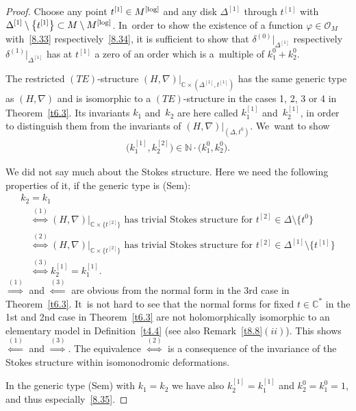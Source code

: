 \documentclass[pdftex]{sigma}%
\numberwithin{equation}{section}
\numberwithin{figure}{section}
\newcommand{\N}{{\mathbb N}}
\newcommand{\C}{{\mathbb C}}
\newcommand{\OO}{{\mathcal O}}
\newcommand{\nnn}{\nabla}
\begin{document}
\begin{proof}
Choose any point $t^{[1]}\in M^{\rm [log]}$ and any disk
$\Delta^{[1]}$ through $t^{[1]}$ with
$\Delta^{[1]}\setminus \big\{t^{[1]}\big\}\subset M\setminus M^{\rm [log]}$. In~order to show the existence of a function $\varphi\in\OO_M$
with~\eqref{8.33} respectively~\eqref{8.34},
it is sufficient to show that $\delta^{(0)}|_{\Delta^{[1]}}$
respectively $\delta^{(1)}|_{\Delta^{[1]}}$
has at $t^{[1]}$ a zero of an order which is a~multiple of
$k_1^0+k_2^0$.

The restricted $(TE)$-structure
$(H,\nnn)|_{\C\times(\Delta^{[1]},t^{[1]})}$ has the same generic
type as $(H,\nnn)$ and is isomorphic to a $(TE)$-structure
in the cases 1, 2, 3 or 4 in Theorem~\ref{t6.3}.
Its invariants $k_1$ and~$k_2$ are here called
$k_1^{[1]}$ and~$k_2^{[1]}$, in order to distinguish them
from the invariants of $(H,\nnn)|_{(\Delta,t^0)}$.
We~want to show
\begin{gather}\label{8.35}
\big(k_1^{[1]},k_2^{[2]}\big)\in \N\cdot \big(k_1^0,k_2^0\big).
\end{gather}

We did not say much about the Stokes structure.
Here we need the following properties of it, if the
generic type is (Sem):
\begin{gather*}%
 k_2=k_1
 \\
\quad \stackrel{(1)}{\iff} (H,\nnn)|_{\C\times\{t^{[2]}\}}
\text{ has trivial Stokes structure for }
t^{[2]}\in\Delta\setminus \big\{t^0\big\}
 \\
\quad \stackrel{(2)}{\iff} (H,\nnn)|_{\C\times\{t^{[2]}\}}
\text{ has trivial Stokes structure for }
t^{[2]}\in\Delta^{[1]}\setminus \big\{t^{[1]}\big\}
 \\
\quad \stackrel{(3)}{\iff} k_2^{[1]}=k_1^{[1]}.
\end{gather*}
$\stackrel{(1)}{\Longrightarrow}$ and
$\stackrel{(3)}{\Longleftarrow}$ are obvious from the
normal form in the 3rd case in Theorem~\ref{t6.3}. It~is not hard to see that the normal forms for fixed
$t\in\C^*$ in the 1st and 2nd case in Theorem~\ref{t6.3}
are not holomorphically isomorphic to an
elementary model in Definition~\ref{t4.4}
(see also Remark~\ref{t8.8}$(ii)$).
This shows $\stackrel{(1)}{\Longleftarrow}$ and
$\stackrel{(3)}{\Longrightarrow}$.
The equivalence $\stackrel{(2)}{\iff}$ is a consequence
of the invariance of the Stokes structure within
isomonodromic deformations.

In the generic type (Sem) with $k_1=k_2$ we have also
$k_2^{[1]}=k_1^{[1]}$ and $k_2^0=k_1^0=1$, and thus
especially~\eqref{8.35}.


\end{proof}
\end{document}
